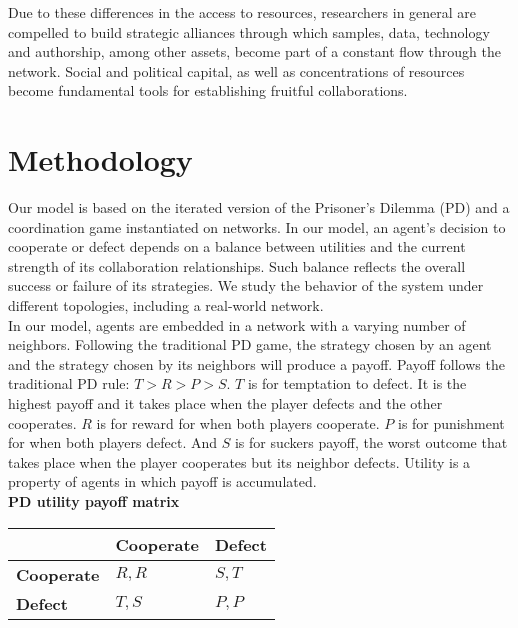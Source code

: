 \documentclass{bmcart}
\begin{document}
Due to these differences in the access to resources, researchers in
general are compelled to build strategic alliances through which samples, data,
technology and authorship, among other assets, become part of a constant flow through
the network. Social and political capital, as well as concentrations of
resources become fundamental tools for establishing fruitful collaborations. 

\section*{Methodology}


Our model is based on the iterated version of the Prisoner's Dilemma (PD) and a
coordination game instantiated on networks. In our model, an agent's decision to
cooperate or defect depends on a balance between utilities and the current
strength of its collaboration relationships. Such balance reflects the overall
success or failure of its strategies. We study the behavior of the system under
different topologies, including a
real-world network.\\


In our model, agents are embedded in a network with a varying number of
neighbors. Following the traditional PD game, the strategy chosen by an agent
and the strategy chosen by its neighbors will produce a payoff. Payoff follows
the traditional PD rule: $T > R > P > S$. $T$ is for temptation to defect. It is the highest
payoff and it takes place when the player defects and the other cooperates. $R$
is for reward for when both players cooperate. $P$ is for punishment for when
both players defect. And $S$ is for suckers payoff, the worst outcome that
takes place when the player cooperates but its neighbor defects. Utility is a
property of agents in which payoff is accumulated.\\   

{\bf PD utility payoff matrix}\\

\begin{tabular}{| l | l | l |}
\hline
          & \bf{Cooperate} & \bf{Defect} \\ \hline
\bf{Cooperate} &  $R,R$      &  $S,T$   \\ \hline
\bf{Defect}    &  $T,S$      &  $P,P$   \\ \hline

\end{tabular}\\ \\
\end{document}
